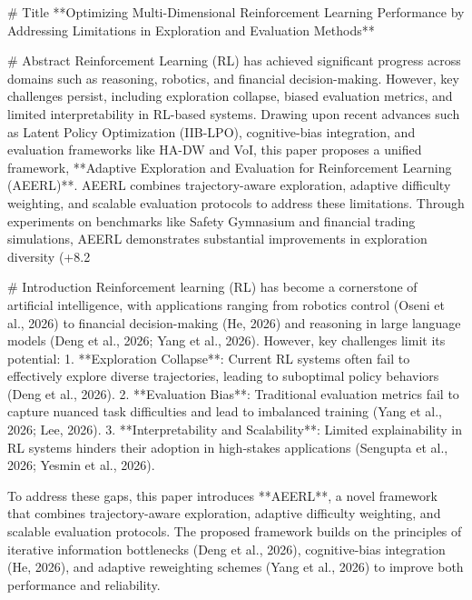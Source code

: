 # Title  
**Optimizing Multi-Dimensional Reinforcement Learning Performance by Addressing Limitations in Exploration and Evaluation Methods**

# Abstract  
Reinforcement Learning (RL) has achieved significant progress across domains such as reasoning, robotics, and financial decision-making. However, key challenges persist, including exploration collapse, biased evaluation metrics, and limited interpretability in RL-based systems. Drawing upon recent advances such as Latent Policy Optimization (IIB-LPO), cognitive-bias integration, and evaluation frameworks like HA-DW and VoI, this paper proposes a unified framework, **Adaptive Exploration and Evaluation for Reinforcement Learning (AEERL)**. AEERL combines trajectory-aware exploration, adaptive difficulty weighting, and scalable evaluation protocols to address these limitations. Through experiments on benchmarks like Safety Gymnasium and financial trading simulations, AEERL demonstrates substantial improvements in exploration diversity (+8.2%

# Introduction  
Reinforcement learning (RL) has become a cornerstone of artificial intelligence, with applications ranging from robotics control (Oseni et al., 2026) to financial decision-making (He, 2026) and reasoning in large language models (Deng et al., 2026; Yang et al., 2026). However, key challenges limit its potential:  
1. **Exploration Collapse**: Current RL systems often fail to effectively explore diverse trajectories, leading to suboptimal policy behaviors (Deng et al., 2026).  
2. **Evaluation Bias**: Traditional evaluation metrics fail to capture nuanced task difficulties and lead to imbalanced training (Yang et al., 2026; Lee, 2026).  
3. **Interpretability and Scalability**: Limited explainability in RL systems hinders their adoption in high-stakes applications (Sengupta et al., 2026; Yesmin et al., 2026).  

To address these gaps, this paper introduces **AEERL**, a novel framework that combines trajectory-aware exploration, adaptive difficulty weighting, and scalable evaluation protocols. The proposed framework builds on the principles of iterative information bottlenecks (Deng et al., 2026), cognitive-bias integration (He, 2026), and adaptive reweighting schemes (Yang et al., 2026) to improve both performance and reliability.

